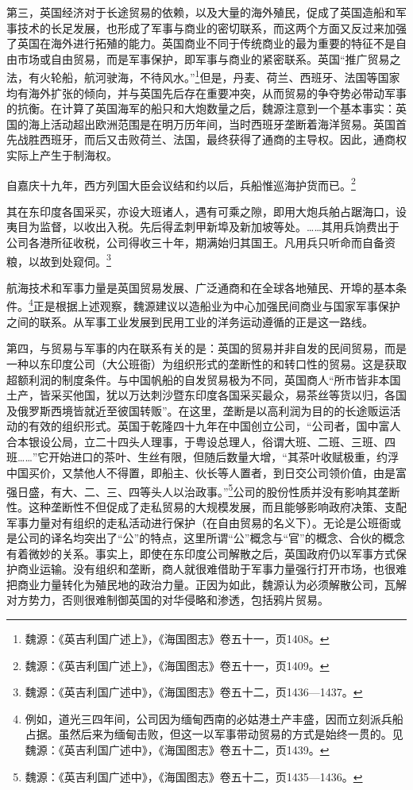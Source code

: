 \documentclass[a4paper, 12pt, openright]{ctexbook}
\renewenvironment{quote}
  {\list{}{\rightmargin2\ccwd \leftmargin2\ccwd \itemindent=2\ccwd \listparindent=2\ccwd}%
   \item\relax\small\kaishu\color{black}}
  {\endlist}
\begin{document}
第三，英国经济对于长途贸易的依赖，以及大量的海外殖民，促成了英国造船和军事技术的长足发展，也形成了军事与商业的密切联系，而这两个方面又反过来加强了英国在海外进行拓殖的能力。英国商业不同于传统商业的最为重要的特征不是自由市场或自由贸易，而是军事保护，即军事与商业的紧密联系。英国“推广贸易之法，有火轮船，航河驶海，不待风水。”\footnote{魏源：《英吉利国广述上》，《海国图志》卷五十一，页1408。}但是，丹麦、荷兰、西班牙、法国等国家均有海外扩张的倾向，并与英国先后存在重要冲突，从而贸易的争夺势必带动军事的抗衡。在计算了英国海军的船只和大炮数量之后，魏源注意到一个基本事实：英国的海上活动超出欧洲范围是在明万历年间，当时西班牙垄断着海洋贸易。英国首先战胜西班牙，而后又击败荷兰、法国，最终获得了通商的主导权。因此，通商权实际上产生于制海权。

\begin{quote}
自嘉庆十九年，西方列国大臣会议结和约以后，兵船惟巡海护货而已。\footnote{魏源：《英吉利国广述上》，《海国图志》卷五十一，页1409。}
\end{quote}

\begin{quote}
其在东印度各国采买，亦设大班诸人，遇有可乘之隙，即用大炮兵舶占踞海口，设夷目为监督，以收出入税。先后得孟刺甲新埠及新加坡等处。……其用兵饷费出于公司各港所征收税，公司得收三十年，期满始归其国王。凡用兵只听命而自备资粮，以故到处窥伺。\footnote{魏源：《英吉利国广述中》，《海国图志》卷五十二，页1436—1437。}
\end{quote}

航海技术和军事力量是英国贸易发展、广泛通商和在全球各地殖民、开埠的基本条件。\footnote{例如，道光三四年间，公司因为缅甸西南的必姑港土产丰盛，因而立刻派兵船占据。虽然后来为缅甸击败，但这一以军事带动贸易的方式是始终一贯的。见魏源：《英吉利国广述中》，《海国图志》卷五十二，页1439。}正是根据上述观察，魏源建议以造船业为中心加强民间商业与国家军事保护之间的联系。从军事工业发展到民用工业的洋务运动遵循的正是这一路线。

第四，与贸易与军事的内在联系有关的是：英国的贸易并非自发的民间贸易，而是一种以东印度公司（大公班衙）为组织形式的垄断性的和转口性的贸易。这是获取超额利润的制度条件。与中国帆船的自发贸易极为不同，英国商人“所市皆非本国土产，皆采买他国，犹以万达刺沙暨东印度各国采买最众，易茶丝等货以归，各国及俄罗斯西境皆就近至彼国转贩”。在这里，垄断是以高利润为目的的长途贩运活动的有效的组织形式。英国于乾隆四十九年在中国创立公司，“公司者，国中富人合本银设公局，立二十四头人理事，于粤设总理人，俗谓大班、二班、三班、四班……”它开始进口的茶叶、生丝有限，但随后数量大增，“其茶叶收赋极重，约浮中国买价，又禁他人不得置，即船主、伙长等人置者，到日交公司领价值，由是富强日盛，有大、二、三、四等头人以治政事。”\footnote{魏源：《英吉利国广述中》，《海国图志》卷五十二，页1435—1436。}公司的股份性质并没有影响其垄断性。这种垄断性不但促成了走私贸易的大规模发展，而且能够影响政府决策、支配军事力量对有组织的走私活动进行保护（在自由贸易的名义下）。无论是公班衙或是公司的译名均突出了“公”的特点，这里所谓“公”概念与“官”的概念、合伙的概念有着微妙的关系。事实上，即使在东印度公司解散之后，英国政府仍以军事方式保护商业运输。没有组织和垄断，商人就很难借助于军事力量强行打开市场，也很难把商业力量转化为殖民地的政治力量。正因为如此，魏源认为必须解散公司，瓦解对方势力，否则很难制御英国的对华侵略和渗透，包括鸦片贸易。
\end{document}
